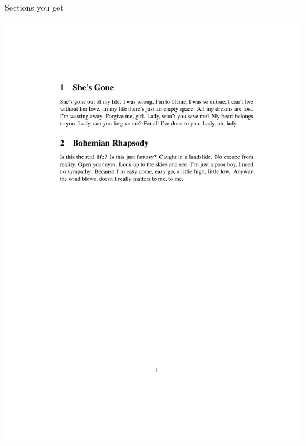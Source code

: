 \documentclass[12pt]{gshs_lecture}
\begin{document}
\begin{frame}[t]{Sections}\small
you get
\begin{center}
\begin{framed}
\includegraphics[width=\textwidth,trim={0cm 16cm 0cm 3cm},clip]{./test_article/article002.pdf}
\end{framed}
\end{center}
\end{frame}
\end{document}
